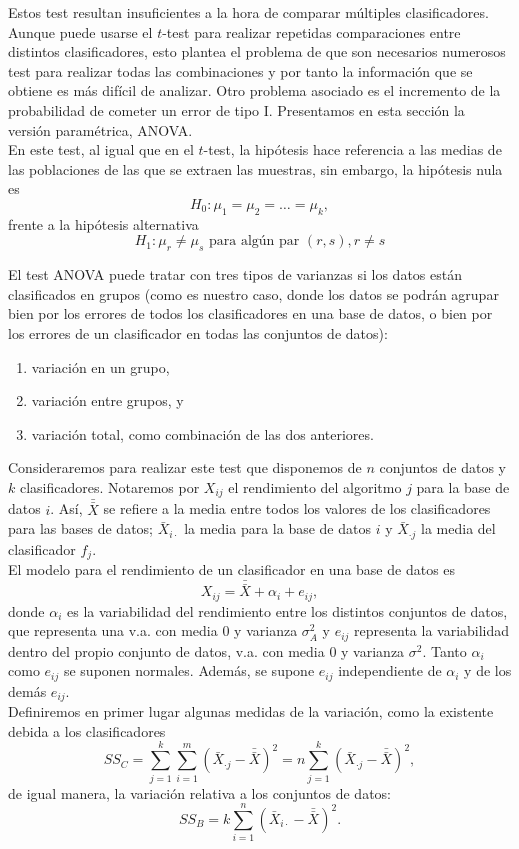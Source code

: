 	Estos test resultan insuficientes a la hora de comparar 
múltiples clasificadores. Aunque puede usarse el $t$-test para 
realizar repetidas comparaciones entre distintos 
clasificadores, esto plantea el problema de que son 
necesarios numerosos test para realizar todas las 
combinaciones y por tanto la información que se obtiene es
más difícil de analizar. Otro problema asociado es el 
incremento de la probabilidad de cometer un error de tipo I. 
Presentamos en esta sección la versión paramétrica, ANOVA.\\
	En este test, al igual que en el $t$-test, la hipótesis 
hace referencia a las medias de las poblaciones de las que 
se extraen las muestras, sin embargo, la hipótesis nula es
	\[
		H_0 : \mu_1 = \mu_2 = \dots = \mu_k,
	\]
	frente a la hipótesis alternativa
	\[
		H_1 : \mu_r \neq \mu_s \text{ para algún par }
			(r, s), r \neq s 
	\]
	
	El test ANOVA puede tratar con tres tipos de varianzas
si los datos están clasificados en grupos (como es nuestro
caso, donde los datos se podrán agrupar bien por los errores
de todos los clasificadores en una base de datos, o bien por
los errores de un clasificador en todas las conjuntos de datos):
	\begin{enumerate}
	\item variación en un grupo,
	\item variación entre grupos, y
	\item variación total, como combinación de las 
		dos anteriores.
	\end{enumerate}

	Consideraremos para realizar este test que disponemos de 
$n$ conjuntos de datos y $k$ clasificadores. Notaremos por 
$X_{ij}$ el rendimiento del algoritmo $j$ para la base de 
datos $i$. Así, $\bar{\bar{X}}$ se refiere a la media entre 
todos los valores de los clasificadores para las bases de
datos; $\bar{X}_{i \cdot}$ la media para la base de datos $i$ 
y $\bar{X}_{\cdot j}$ la media del clasificador $f_j$.\\
	El modelo para el rendimiento de un clasificador en una 
base de datos es
	\[
		X_{ij} = \bar{\bar{X}} + \alpha_i + e_{ij},
	\]
	donde $\alpha_i$ es la variabilidad del rendimiento entre 
los distintos conjuntos de datos, que representa una v.a. con media 0 y
varianza $\sigma_A^2$ y $e_{ij}$ representa la variabilidad
dentro del propio conjunto de datos, v.a. con media 
0 y varianza $\sigma^2$. Tanto $\alpha_i$ como
$e_{ij}$ se suponen normales. Además, se supone $e_{ij}$ 
independiente de $\alpha_i$ y de los demás $e_{ij}$.\\
	Definiremos en primer lugar algunas medidas de la 
variación, como la existente debida a los clasificadores
	\[ 
		SS_C = \sum\limits_{j=1}^k
				 \sum\limits_{i=1}^m
					\left( \bar{X}_{\cdot j} - 
						   \bar{\bar{X}} \right)^2 =
				n \sum\limits_{j=1}^k
					\left( \bar{X}_{\cdot j} - 
					  	   \bar{\bar{X}} \right)^2,
	\]
	de igual manera, la variación relativa a los conjuntos de
datos:
	\[ 
		SS_B = k \sum\limits_{i=1}^n
					\left( \bar{X}_{i \cdot} - 
					  	   \bar{\bar{X}} \right)^2.
	\]
	
